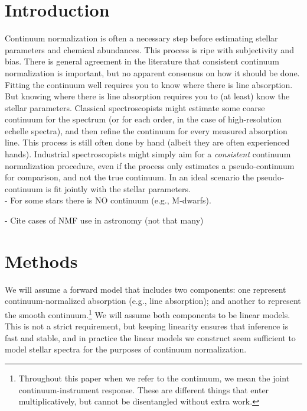 \documentclass[modern]{aastex631}
\begin{document}

\section*{}\clearpage
\section{Introduction}\label{sec:intro}

Continuum normalization is often a necessary step before estimating stellar parameters and chemical abundances.
This process is ripe with subjectivity and bias.
There is general agreement in the literature that consistent continuum normalization is important, but no apparent consensus on how it should be done.\\

Fitting the continuum well requires you to know where there is line absorption. But knowing where there is line absorption requires you to (at least) know the stellar parameters. Classical spectroscopists might estimate some coarse continuum for the spectrum (or for each order, in the case of high-resolution echelle spectra), and then refine the continuum for every measured absorption line. This process is still often done by hand (albeit they are often experienced hands). Industrial spectroscopists might simply aim for a \emph{consistent} continuum normalization procedure, even if the process only estimates a pseudo-continuum for comparison, and not the true continuum. In an ideal scenario the pseudo-continuum is fit jointly with the stellar parameters.\\


- For some stars there is NO continuum (e.g., M-dwarfs). 

- Cite cases of NMF use in astronomy (not that many)


\section{Methods}\label{sec:methods}

We will assume a forward model that includes two components: one represent continuum-normalized absorption (e.g., line absorption); and another to represent the smooth continuum.\footnote{Throughout this paper when we refer to the continuum, we mean the joint continuum-instrument response. These are different things that enter multiplicatively, but cannot be disentangled without extra work.} We will assume both components to be linear models. This is not a strict requirement, but keeping linearity ensures that inference is fast and stable, and in practice the linear models we construct seem sufficient to model stellar spectra for the purposes of continuum normalization.\\
\end{document}

